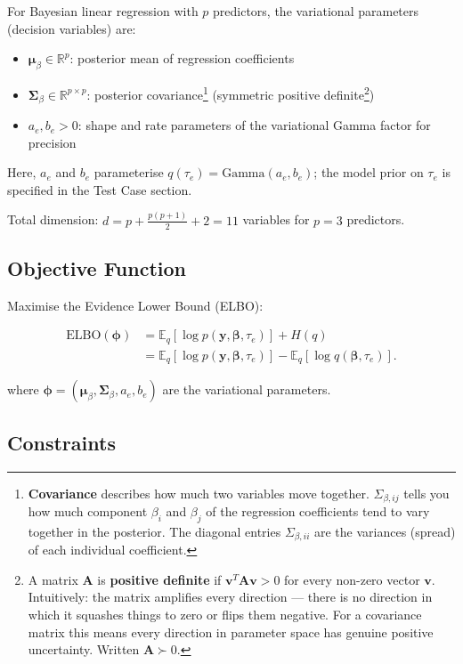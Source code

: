 \documentclass[11pt]{article}
\newcommand{\E}{\mathbb{E}}
\newcommand{\R}{\mathbb{R}}
\newcommand{\ELBO}{\text{ELBO}}
\begin{document}
For Bayesian linear regression with $p$ predictors, the variational parameters (decision variables) are:
\begin{itemize}
\item $\bm{\mu}_\beta \in \R^p$: posterior mean of regression coefficients
\item $\bm{\Sigma}_\beta \in \R^{p \times p}$: posterior covariance\footnote{\textbf{Covariance} describes how much two variables move together. $\Sigma_{\beta,ij}$ tells you how much component $\beta_i$ and $\beta_j$ of the regression coefficients tend to vary together in the posterior. The diagonal entries $\Sigma_{\beta,ii}$ are the variances (spread) of each individual coefficient.} (symmetric positive definite\footnote{A matrix $\bm{A}$ is \textbf{positive definite} if $\bm{v}^T\bm{A}\bm{v} > 0$ for every non-zero vector $\bm{v}$. Intuitively: the matrix amplifies every direction --- there is no direction in which it squashes things to zero or flips them negative. For a covariance matrix this means every direction in parameter space has genuine positive uncertainty. Written $\bm{A} \succ 0$.})
\item $a_e, b_e > 0$: shape and rate parameters of the variational Gamma factor for precision
\end{itemize}

Here, $a_e$ and $b_e$ parameterise $q(\tau_e)=\mathrm{Gamma}(a_e,b_e)$; the model prior on $\tau_e$ is specified in the Test Case section.

Total dimension: $d = p + \frac{p(p+1)}{2} + 2 = 11$ variables for $p=3$ predictors.

\subsection*{Objective Function}

Maximise the Evidence Lower Bound (ELBO):

\begin{align}
\ELBO(\bm{\phi})
&= \E_q[\log p(\bm{y}, \bm{\beta}, \tau_e)] + H(q) \\
&= \E_q[\log p(\bm{y}, \bm{\beta}, \tau_e)] - \E_q[\log q(\bm{\beta}, \tau_e)] .
\end{align}

where $\bm{\phi} = (\bm{\mu}_\beta, \bm{\Sigma}_\beta, a_e, b_e)$ are the variational parameters.

\subsection*{Constraints}
\end{document}

